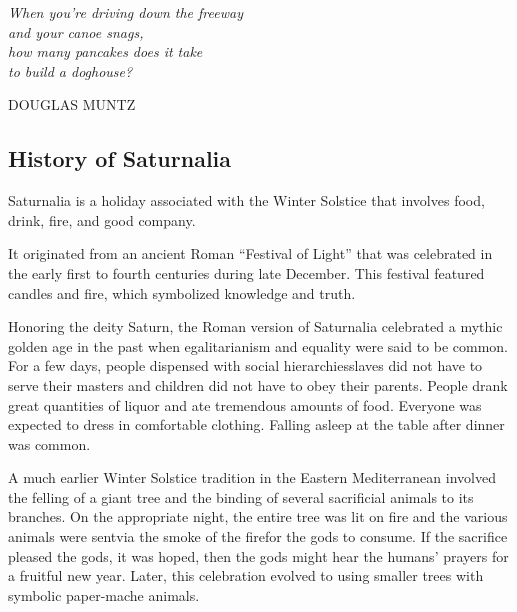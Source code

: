 \documentclass{memoir}
\begin{document}
\parbox{370pt}{
  \raggedright{\huge\itshape
  When you're driving down the freeway \\ 
  and your canoe snags,  \\
  how many pancakes does it take \\ 
  to build a doghouse?\par\bigskip
  }   
  \raggedleft\Large\MakeUppercase{Douglas Muntz}\par
}

\vfill\vfill

\clearpage \newpage

\pagestyle{empty}
\newpage
\mbox{}
\clearpage

\pagestyle{empty}

\begin{flushleft}
\large
\baselineskip=17pt
\parskip =14pt
\section*{\textbf{History of Saturnalia}}
\par
Saturnalia is a holiday associated with the Winter Solstice that involves food, drink, fire, and good company.  

\par
It originated from an ancient Roman ``Festival of Light'' that was celebrated in the early first to fourth centuries during late December.  This festival featured candles and fire, which symbolized knowledge and truth.

\par
Honoring the deity Saturn, the Roman version of Saturnalia celebrated a mythic golden age in the past when egalitarianism and equality were said to be common.  For a few days, people dispensed with social hierarchies\textemdash slaves did not have to serve their masters and children did not have to obey their parents.  People drank great quantities of liquor and ate tremendous amounts of food. Everyone was expected to dress in comfortable clothing. Falling asleep at the table after dinner was common.


\par
A much earlier Winter Solstice tradition in the Eastern Mediterranean involved the felling of a giant tree and the binding of several sacrificial animals to its branches. On the appropriate night, the entire tree was lit on fire and the various animals were sent\textemdash via the smoke of the fire\textemdash for the gods to consume.  If the sacrifice pleased the gods, it was hoped, then the gods might hear the humans' prayers for a fruitful new year.  Later, this celebration evolved to using smaller trees with symbolic paper-mache animals.  


\end{flushleft}
\end{document}
